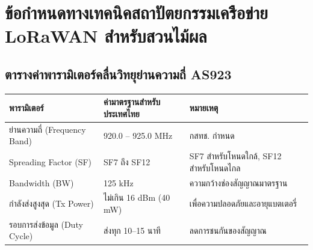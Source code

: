 \chapter{ข้อกำหนดทางเทคนิคสถาปัตยกรรมเครือข่าย LoRaWAN สำหรับสวนไม้ผล}
\label{app:appendixB}

\section{ตารางค่าพารามิเตอร์คลื่นวิทยุย่านความถี่ AS923}
\begin{table}[H]
\centering\small
\begin{tabularx}{\textwidth}{p{} p{} X}
\toprule
\textbf{พารามิเตอร์} & \textbf{ค่ามาตรฐานสำหรับประเทศไทย} & \textbf{หมายเหตุ} \\
\midrule
ย่านความถี่ (Frequency Band) & 920.0 -- 925.0 MHz & กสทช. กำหนด \\
Spreading Factor (SF) & SF7 ถึง SF12 & SF7 สำหรับโหนดใกล้, SF12 สำหรับโหนดไกล \\
Bandwidth (BW) & 125 kHz & ความกว้างช่องสัญญาณมาตรฐาน \\
กำลังส่งสูงสุด (Tx Power) & ไม่เกิน 16 dBm (40 mW) & เพื่อความปลอดภัยและอายุแบตเตอรี่ \\
รอบการส่งข้อมูล (Duty Cycle) & ส่งทุก 10--15 นาที & ลดการชนกันของสัญญาณ \\
\bottomrule
\end{tabularx}
\end{table}
